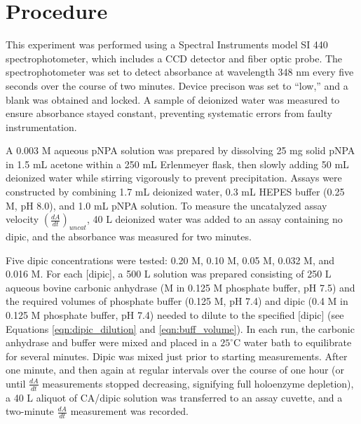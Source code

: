 \section{Procedure}
This experiment was performed using a Spectral Instruments model SI 440 spectrophotometer, which includes a CCD detector and fiber optic probe. The spectrophotometer was set to detect absorbance at wavelength 348 nm every five seconds over the course of two minutes. Device precison was set to ``low,'' and a blank was obtained and locked. A sample of deionized water was measured to ensure absorbance stayed constant, preventing systematic errors from faulty instrumentation.

A 0.003 M aqueous pNPA solution was prepared by dissolving 25 mg solid pNPA in 1.5 mL acetone within a 250 mL Erlenmeyer flask, then slowly adding 50 mL deionized water while stirring vigorously to prevent precipitation. Assays were constructed by combining 1.7 mL deionized water, 0.3 mL HEPES buffer (0.25 M, pH 8.0), and 1.0 mL pNPA solution. To measure the uncatalyzed assay velocity $\left( \frac{dA}{dt} \right)_{uncat}$, 40 {\textmu}L deionized water was added to an assay containing no dipic, and the absorbance was measured for two minutes.

Five dipic concentrations were tested: 0.20 M, 0.10 M, 0.05 M, 0.032 M, and 0.016 M. For each [dipic], a 500 {\textmu}L solution was prepared consisting of 250 {\textmu}L aqueous bovine carbonic anhydrase (\caconc M in 0.125 M phosphate buffer, pH 7.5) and the required volumes of phosphate buffer (0.125 M, pH 7.4) and dipic (0.4 M in 0.125 M phosphate buffer, pH 7.4) needed to dilute to the specified [dipic] (see Equations \eqref{eqn:dipic_dilution} and \eqref{eqn:buff_volume}). In each run, the carbonic anhydrase and buffer were mixed and placed in a $25^{\circ}$C water bath to equilibrate for several minutes. Dipic was mixed just prior to starting measurements. After one minute, and then again at regular intervals over the course of one hour (or until $\frac{dA}{dt}$ measurements stopped decreasing, signifying full holoenzyme depletion), a 40 {\textmu}L aliquot of CA/dipic solution was transferred to an assay cuvette, and a two-minute $\frac{dA}{dt}$ measurement was recorded. 